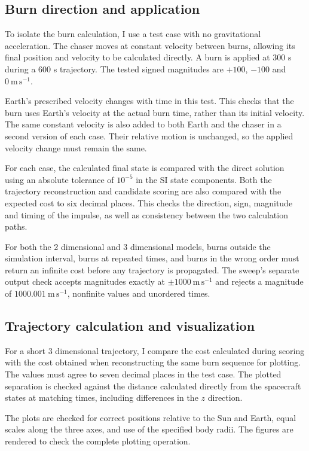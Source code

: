 \documentclass[11pt,letterpaper]{article}
\begin{document}
\subsection{Burn direction and application}
To isolate the burn calculation, I use a test case with no gravitational
acceleration. The chaser moves at constant velocity between burns,
allowing its final position and velocity to be calculated directly.
A burn is applied at 300 s during a 600 s trajectory. The tested signed
magnitudes are $+100$, $-100$ and $0\ \mathrm{m\,s^{-1}}$.

Earth's prescribed velocity changes with time in this test. This
checks that the burn uses Earth's velocity at the actual burn time,
rather than its initial velocity. The same constant velocity is also
added to both Earth and the chaser in a second version of each case.
Their relative motion is unchanged, so the applied velocity change
must remain the same.

For each case, the calculated final state is compared with the direct
solution using an absolute tolerance of $10^{-5}$ in the SI state
components. Both the trajectory reconstruction and candidate scoring
are also compared with the expected cost to six decimal places.
This checks the direction, sign, magnitude and timing of the impulse,
as well as consistency between the two calculation paths.

For both the 2 dimensional and 3 dimensional models, burns outside
the simulation interval, burns at repeated times, and burns in the
wrong order must return an infinite cost before any trajectory is
propagated. The sweep's separate output check accepts magnitudes
exactly at $\pm1000\ \mathrm{m\,s^{-1}}$ and rejects a magnitude of
$1000.001\ \mathrm{m\,s^{-1}}$, nonfinite values and unordered times.

\subsection{Trajectory calculation and visualization}
For a short 3 dimensional trajectory, I compare the cost calculated
during scoring with the cost obtained when reconstructing the same
burn sequence for plotting. The values must agree to seven decimal
places in the test case. The plotted separation is checked against
the distance calculated directly from the spacecraft states at
matching times, including differences in the $z$ direction.

The plots are checked for correct positions relative to the Sun and
Earth, equal scales along the three axes, and use of the specified
body radii. The figures are rendered to check the complete plotting
operation.
\end{document}
